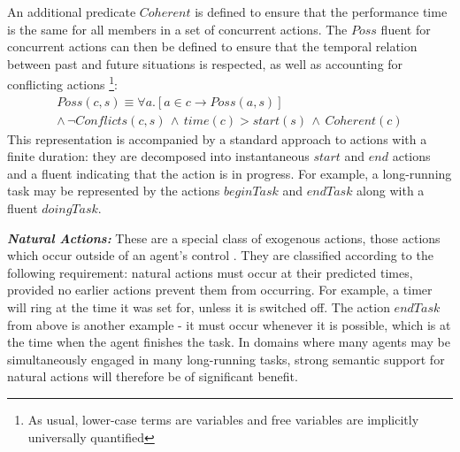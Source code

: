 An additional predicate $Coherent$ is defined to ensure that the
performance time is the same for all members in a set of concurrent
actions. The $Poss$ fluent for concurrent actions can then be defined
to ensure that the temporal relation between past and future situations
is respected, as well as accounting for conflicting actions%
\footnote{As usual, lower-case terms are variables and free variables are implicitly
universally quantified%
}:\begin{multline*}
Poss(c,s)\equiv\forall a.\left[a\in c\rightarrow Poss(a,s)\right]\\
\wedge\,\neg Conflicts(c,s)\,\wedge\, time(c)>start(s)\,\wedge\, Coherent(c)\end{multline*}
 This representation is accompanied by a standard approach to actions
with a finite duration: they are decomposed into instantaneous $start$
and $end$ actions and a fluent indicating that the action is in progress.
For example, a long-running task may be represented by the actions
$beginTask$ and $endTask$ along with a fluent $doingTask$.

\textbf{\emph{Natural Actions:}} These are a special class of exogenous
actions, those actions which occur outside of an agent's control \cite{reiter96sc_nat_conc}.
They are classified according to the following requirement: natural
actions must occur at their predicted times, provided no earlier actions
prevent them from occurring. For example, a timer will ring at the
time it was set for, unless it is switched off. The action $endTask$
from above is another example - it must occur whenever it is possible,
which is at the time when the agent finishes the task. In domains
where many agents may be simultaneously engaged in many long-running
tasks, strong semantic support for natural actions will therefore
be of significant benefit.

